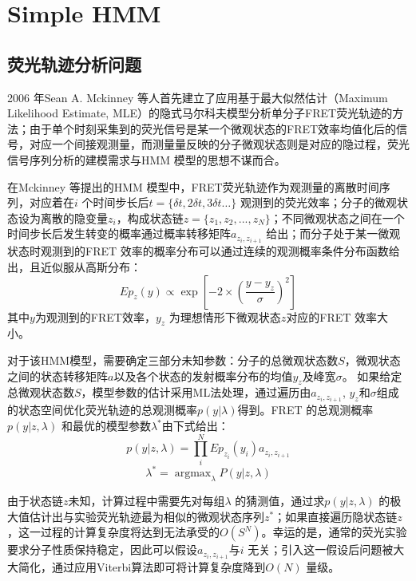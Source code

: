 \documentclass[11pt, a4paper]{article}
\DeclareMathOperator*{\argmax}{argmax}
\begin{document}
\section{Simple HMM}\label{chapter:HMM}
\subsection{荧光轨迹分析问题}

2006 年Sean A. Mckinney 等人首先建立了应用基于最大似然估计（Maximum Likelihood Estimate, MLE）的隐式马尔科夫模型分析单分子FRET荧光轨迹的方法\cite{HMM}；由于单个时刻采集到的荧光信号是某一个微观状态的FRET效率均值化后的信号，对应一个间接观测量，而测量量反映的分子微观状态则是对应的隐过程，荧光信号序列分析的建模需求与HMM 模型的思想不谋而合。

在Mckinney 等提出的HMM 模型中，FRET荧光轨迹作为观测量的离散时间序列，对应着在$i$ 个时间步长后$t=\{\delta t,2\delta t,3\delta t…\}$ 观测到的荧光效率；分子的微观状态设为离散的隐变量$z_i$，构成状态链$z=\{z_1,z_2,...,z_N\}$；不同微观状态之间在一个时间步长后发生转变的概率通过概率转移矩阵$a_{z_{i}, z_{i+1}}$ 给出；而分子处于某一微观状态时观测到的FRET 效率的概率分布可以通过连续的观测概率条件分布函数给出，且近似服从高斯分布：
\begin{equation}
Ep_z(y) \propto \exp\left[-2\times\left(\frac{y- y_z}{\sigma}\right)^2\right]
\end{equation}
其中$y$为观测到的FRET效率，$y_{z}$ 为理想情形下微观状态$z$对应的FRET 效率大小。

对于该HMM模型，需要确定三部分未知参数：分子的总微观状态数$S$，微观状态之间的状态转移矩阵$a$以及各个状态的发射概率分布的均值$y_{z}$及峰宽$\sigma$。 如果给定总微观状态数$S$，模型参数的估计采用ML法处理，通过遍历由$a_{z_{i}, z_{i+1}}$, $y_{z} $和$\sigma$组成的状态空间优化荧光轨迹的总观测概率$p(y| \lambda)$得到。FRET 的总观测概率$p(y|z,\lambda)$ 和最优的模型参数$\lambda^*$由下式给出：
\begin{equation}
p(y|z,\lambda)= \prod_i^N Ep_{z_i}(y_i) a_{z_{i}, z_{i+1}}
\end{equation}
\begin{equation}
\lambda^*=\argmax_{\lambda} P(y|z,\lambda)
\end{equation}


由于状态链$z$未知，计算过程中需要先对每组$\lambda$ 的猜测值，通过求$p(y|z,\lambda)$ 的极大值估计出与实验荧光轨迹最为相似的微观状态序列$z^*$；如果直接遍历隐状态链$z$，这一过程的计算复杂度将达到无法承受的$O(S^N)$。幸运的是，通常的荧光实验要求分子性质保持稳定，因此可以假设$a_{z_{i}, z_{i+1}}$与$i$ 无关；引入这一假设后问题被大大简化，通过应用Viterbi算法即可将计算复杂度降到$O(N)$ 量级。
\end{document}
